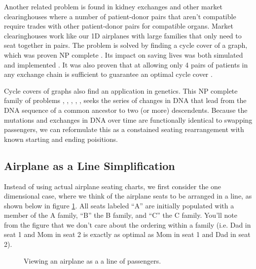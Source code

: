 Another related problem is found in kidney exchanges and other market clearinghouses where a number of patient-donor pairs that aren't compatible require trades with other patient-donor pairs for compatible organs.  Market clearinghouses work like our 1D airplanes with large families that only need to seat together in pairs.  The problem is solved by finding a cycle cover of a graph, which was proven NP complete \cite{abraham2007clearing}.  Its impact on saving lives was both simulated \cite{roth2004kidney} and implemented \cite{abraham2007clearing}.  It was also proven that at allowing only 4 pairs of patients in any exchange chain is sufficient to guarantee an optimal cycle cover \cite{roth2007efficient}.

Cycle covers of graphs also find an application in genetics.  This NP complete family of problems \cite{bryant1998complexity}, \cite{durrett2005genomic}, \cite{goldberg2001complexity}, \cite{caprara1999formulations}, \cite{sankoff1997median}, \cite{popov2007multiple} seeks the series of changes in DNA that lead from the DNA sequence of a common ancestor to two (or more) descendents.  Because the mutations and exchanges in DNA over time are functionally identical to swapping passengers, we can reformulate this as a constained seating rearrangement with known starting and ending poisitions.

\subsection{Airplane as a Line Simplification}

Instead of using actual airplane seating charts, we first consider the one dimensional case, where we think of the airplane seats to be arranged in a line, as shown below in figure \ref{fig:lineplane}.  All seats labeled ``A'' are initially populated with a member of the A family, ``B'' the B family, and ``C'' the C family.  You'll note from the figure that we don't care about the ordering within a family (i.e. Dad in seat 1 and Mom in seat 2 is exactly as optimal as Mom in seat 1 and Dad in seat 2). 

\begin{figure}[H]
\label{fig:lineplane}
\centering
{}
\caption{Viewing an airplane as a a line of passengers.}
\end{figure}

